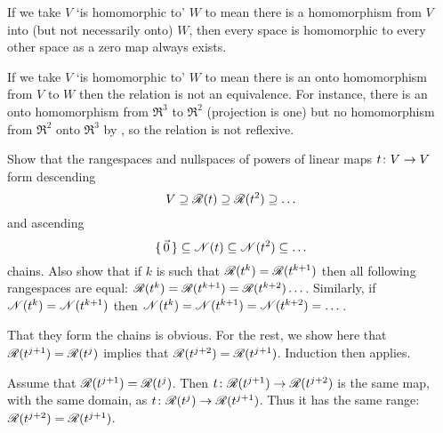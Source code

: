 \begin{exercises}
\begin{answer}
     If we take \( V \) `is homomorphic to' \( W \) to mean there is a
     homomorphism from \( V \) into (but not necessarily onto) \( W \),
     then every space is homomorphic to every other space as a zero map always
     exists.

     If we take \( V \) `is homomorphic to' \( W \) to mean there is an
     onto homomorphism from \( V \) to \( W \) then the relation is not
     an equivalence.
     For instance, there is an onto
     homomorphism from \( \Re^3 \) to \( \Re^2 \)
     (projection is one) but no homomorphism from \( \Re^2 \) onto
     \( \Re^3 \) by ,
     so the relation is not reflexive.  
   \end{answer}
  \item 
    Show that the rangespaces and nullspaces of powers of linear maps
    \( \mbox{$t\colon V\to V$} \) form descending
    \begin{equation*}
      V\supseteq \mathscr{R}(t)\supseteq\mathscr{R}(t^2)\supseteq\ldots
    \end{equation*}
    and ascending
    \begin{equation*}
     \mbox{$\{\,\vec{0}\,\}$}\subseteq\mathscr{N}(t)\subseteq\mathscr{N}(t^2)\subseteq\ldots
    \end{equation*}
    chains.
    Also show that if \( k \) is such that
    \( \mathscr{R}(t^k)=\mathscr{R}(t^{k+1}) \)
    then all following rangespaces are equal:
    \( \mathscr{R}(t^k)=\mathscr{R}(t^{k+1})=\mathscr{R}(t^{k+2})\ldots\, \).
    Similarly, if \( \mathscr{N}(t^k)=\mathscr{N}(t^{k+1}) \)
    then  
    \( \mathscr{N}(t^k)=\mathscr{N}(t^{k+1})=\mathscr{N}(t^{k+2})=\ldots\, \).
    \begin{answer}
      That they form the chains is obvious.
      For the rest, we show here that
      \( \mathscr{R}(t^{j+1})=\mathscr{R}(t^{j}) \)
      implies that
      \( \mathscr{R}(t^{j+2})=\mathscr{R}(t^{j+1}) \).
      Induction then applies.

      Assume that 
      \( \mathscr{R}(t^{j+1})=\mathscr{R}(t^{j}) \).
      Then \( \mbox{$t\colon \mathscr{R}(t^{j+1})\to \mathscr{R}(t^{j+2})$} \)
      is the same map, with the same domain, as
      \( \mbox{$t\colon \mathscr{R}(t^{j})\to \mathscr{R}(t^{j+1})$} \).
      Thus it has the same range:
      \( \mathscr{R}(t^{j+2})=\mathscr{R}(t^{j+1}) \).  
    \end{answer}
\end{exercises}
